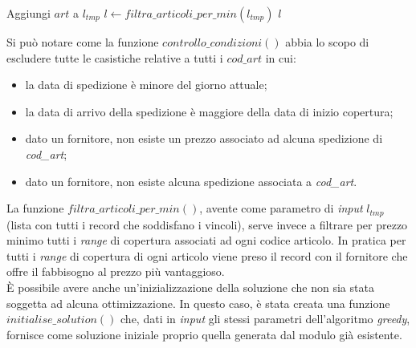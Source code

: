 \begin{algorithm}
    \begin{algorithmic}
                    \State Aggiungi $art$ a $l_{tmp}$
                \EndIf
            \EndFor
        \EndWhile
        \State $l \gets filtra\_articoli\_per\_min(l_{tmp})$
        \State \Return $l$
        \EndProcedure
    \end{algorithmic}
\end{algorithm}
\vspace*{\fill}
\newpage
\noindent Si può notare come la funzione $controllo\_condizioni()$ abbia lo scopo di escludere tutte le casistiche relative a tutti i $cod\_art$ in cui:
\begin{itemize}
    \item la data di spedizione è minore del giorno attuale;
    \item la data di arrivo della spedizione è maggiore della data di inizio copertura;
    \item dato un fornitore, non esiste un prezzo associato ad alcuna spedizione di \textit{cod\_art};
    \item dato un fornitore, non esiste alcuna spedizione associata a \textit{cod\_art}.
\end{itemize}

\noindent La funzione $filtra\_articoli\_per\_min()$, avente come parametro di \textit{input} $l_{tmp}$ (lista con tutti i record che soddisfano i vincoli),
serve invece a filtrare per prezzo minimo tutti i \textit{range} di copertura associati ad ogni codice articolo.
In pratica per tutti i \textit{range} di copertura di ogni articolo viene preso il record con il fornitore che offre il fabbisogno al prezzo più vantaggioso.\\

\noindent È possibile avere anche un'inizializzazione della soluzione che non sia stata soggetta ad alcuna ottimizzazione.
In questo caso, è stata creata una funzione $initialise\_solution()$ che, dati in \textit{input} gli stessi parametri dell'algoritmo \textit{greedy}, fornisce
come soluzione iniziale proprio quella generata dal modulo già esistente. 

